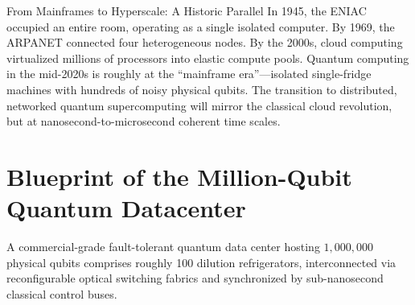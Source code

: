 \begin{historicalbox}{{From Mainframes to Hyperscale: A Historic Parallel}}
In 1945, the ENIAC occupied an entire room, operating as a single isolated computer. By 1969, the ARPANET connected four heterogeneous nodes. By the 2000s, cloud computing virtualized millions of processors into elastic compute pools. Quantum computing in the mid-2020s is roughly at the ``mainframe era''---isolated single-fridge machines with hundreds of noisy physical qubits. The transition to distributed, networked quantum supercomputing will mirror the classical cloud revolution, but at nanosecond-to-microsecond coherent time scales.
\end{historicalbox}


\section{Blueprint of the Million-Qubit Quantum Datacenter}
\label{sec:datacenter_blueprint}

A commercial-grade fault-tolerant quantum data center hosting $1{,}000{,}000$ physical qubits comprises roughly 100 dilution refrigerators, interconnected via reconfigurable optical switching fabrics and synchronized by sub-nanosecond classical control buses.

